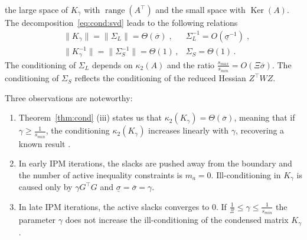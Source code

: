 \documentclass[smallextended]{svjour3}
\DeclareMathOperator{\nullspace}{Ker}
\DeclareMathOperator{\rangespace}{range}
\newcommand{\cond}{\kappa_2}
\begin{document}
the large space of $K_\gamma$ with $\rangespace(A^\top)$
and the small space with $\nullspace(A)$.
The decomposition~\eqref{eq:cond:svd} leads to the following relations
\begin{equation}
  \label{eq:cond:boundinvariantsubspace}
  \begin{aligned}
    & \| K_\gamma \| = \| \Sigma_L \| = \Theta(\overline{\sigma}) \; , &
    \Sigma_L^{-1} = O(\underline{\sigma}^{-1})  \;, \\
    & \| K_\gamma^{-1} \| = \| \Sigma_S^{-1} \| = \Theta(1) \, , &
  \Sigma_S = \Theta(1) \, .
  \end{aligned}
\end{equation}
The conditioning of $\Sigma_L$ depends on $\cond(A)$
and the ratio $\frac{s_{max}}{s_{min}} = O(\Xi \overline{\sigma})$.
The conditioning of $\Sigma_S$ reflects the conditioning of the reduced Hessian $Z^\top W Z$.

Three observations are noteworthy:
\begin{enumerate}
  \item Theorem~\ref{thm:cond} (iii) states us that $\cond(K_\gamma) = \Theta(\overline{\sigma})$,
    meaning that if $\gamma \geq \frac{1}{s_{min}}$,
    the conditioning $\cond(K_\gamma)$ increases linearly with $\gamma$,
    recovering a known result \cite{regev2023hykkt}.
  \item In early IPM iterations, the slacks are pushed away from the boundary
    and the number of active inequality constraints is $m_a = 0$. Ill-conditioning
    in $K_\gamma$ is caused only by $\gamma G^\top G$ and $\underline{\sigma} = \overline{\sigma} = \gamma$.
  \item In late IPM iterations, the active slacks converges to $0$.
    If $\frac{1}{\Xi} \leq \gamma \leq \frac{1}{s_{min}}$ the parameter $\gamma$
    does not increase the ill-conditioning of the condensed matrix $K_\gamma$.
\end{enumerate}
\end{document}
